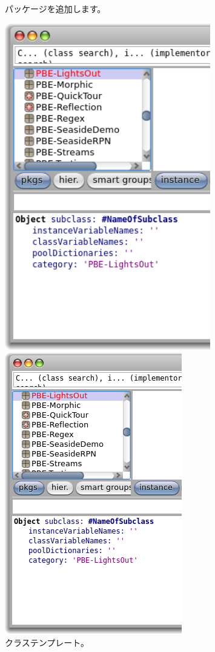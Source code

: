 \documentclass[a4paper,10pt,twoside]{book}
\begin{document}
\begin{figure}[htb]
\begin{minipage}[b]{0.48\textwidth}
	\caption{パッケージを追加します。
	}
\end{minipage}
\hfill
\begin{minipage}[b]{0.48\textwidth}
\ifluluelse
	{\centerline {\includegraphics[width=0.8\textwidth]{ClassTemplate}}}
	{\centerline {\includegraphics[scale=0.6]{ClassTemplate}}}
	\caption{クラステンプレート。
	}
\end{minipage}
\end{figure}
\end{document}
